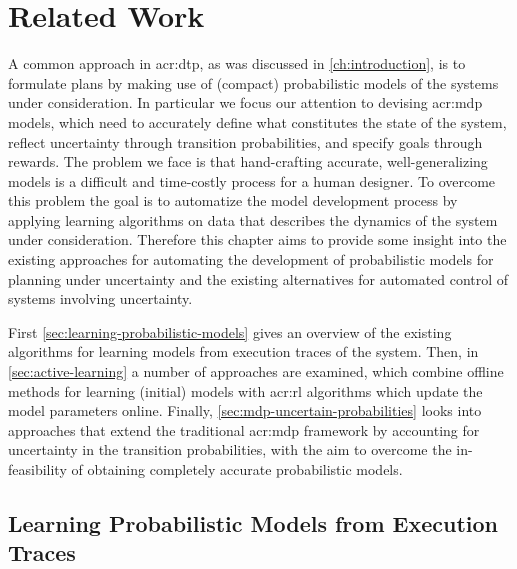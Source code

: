 \chapter{Related Work}
\label{ch:problem-related-work}

A common approach in \acrshort{acr:dtp}, as was discussed in \autoref{ch:introduction}, is to formulate plans by making use of (compact) probabilistic models of the systems under consideration.
In particular we focus our attention to devising \acrshort{acr:mdp} models, which need to accurately define what constitutes the state of the system, reflect uncertainty through transition probabilities, and specify goals through rewards.
The problem we face is that hand-crafting accurate, well-generalizing models is a difficult and time-costly process for a human designer.
To overcome this problem the goal is to automatize the model development process by applying learning algorithms on data that describes the dynamics of the system under consideration.
Therefore this chapter aims to provide some insight into the existing approaches for automating the development of probabilistic models for planning under uncertainty and the existing alternatives for automated control of systems involving uncertainty.

First \autoref{sec:learning-probabilistic-models} gives an overview of the existing algorithms for learning models from execution traces of the system.
Then, in \autoref{sec:active-learning} a number of approaches are examined, which combine offline methods for learning (initial) models with \acrshort{acr:rl} algorithms which update the model parameters online.
Finally, \autoref{sec:mdp-uncertain-probabilities} looks into approaches that extend the traditional \acrshort{acr:mdp} framework by accounting for uncertainty in the transition probabilities, with the aim to overcome the in-feasibility of obtaining completely accurate probabilistic models.

%

\section{Learning Probabilistic Models from Execution Traces}
\label{sec:learning-probabilistic-models}

